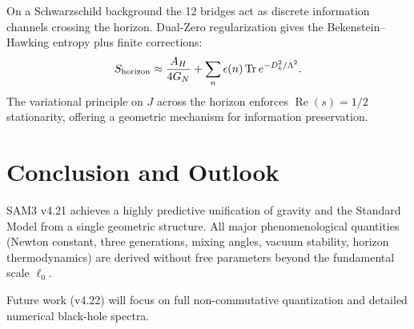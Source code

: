 \documentclass[11pt,a4paper]{article}
\begin{document}
On a Schwarzschild background the 12 bridges act as discrete information channels crossing the horizon. Dual-Zero regularization gives the Bekenstein–Hawking entropy plus finite corrections:
\[
S_{\rm horizon} \approx \frac{A_H}{4G_N} + \sum_n \epsilon(n) \operatorname{Tr} e^{-D_k^2/\Lambda^2}.
\]
The variational principle on \(J\) across the horizon enforces \(\operatorname{Re}(s)=1/2\) stationarity, offering a geometric mechanism for information preservation.

\section{Conclusion and Outlook}

SAM3 v4.21 achieves a highly predictive unification of gravity and the Standard Model from a single geometric structure. All major phenomenological quantities (Newton constant, three generations, mixing angles, vacuum stability, horizon thermodynamics) are derived without free parameters beyond the fundamental scale \(\ell_0\).

Future work (v4.22) will focus on full non-commutative quantization and detailed numerical black-hole spectra.



\end{document}
